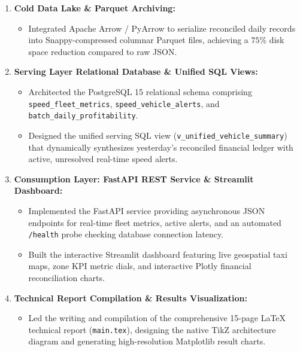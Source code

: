 \documentclass[11pt,a4paper]{article}
\begin{document}
\begin{enumerate}
    \item \textbf{Cold Data Lake \& Parquet Archiving:}
    \begin{itemize}
        \item Integrated Apache Arrow / PyArrow to serialize reconciled daily records into Snappy-compressed columnar Parquet files, achieving a $75\%$ disk space reduction compared to raw JSON.
    \end{itemize}

    \item \textbf{Serving Layer Relational Database \& Unified SQL Views:}
    \begin{itemize}
        \item Architected the PostgreSQL 15 relational schema comprising \texttt{speed\_fleet\_metrics}, \texttt{speed\_vehicle\_alerts}, and \texttt{batch\_daily\_profitability}.
        \item Designed the unified serving SQL view (\texttt{v\_unified\_vehicle\_summary}) that dynamically synthesizes yesterday's reconciled financial ledger with active, unresolved real-time speed alerts.
    \end{itemize}

    \item \textbf{Consumption Layer: FastAPI REST Service \& Streamlit Dashboard:}
    \begin{itemize}
        \item Implemented the FastAPI service providing asynchronous JSON endpoints for real-time fleet metrics, active alerts, and an automated \texttt{/health} probe checking database connection latency.
        \item Built the interactive Streamlit dashboard featuring live geospatial taxi maps, zone KPI metric dials, and interactive Plotly financial reconciliation charts.
    \end{itemize}

    \item \textbf{Technical Report Compilation \& Results Visualization:}
    \begin{itemize}
        \item Led the writing and compilation of the comprehensive 15-page LaTeX technical report (\texttt{main.tex}), designing the native TikZ architecture diagram and generating high-resolution Matplotlib result charts.
    \end{itemize}
\end{enumerate}

\clearpage
\end{document}
